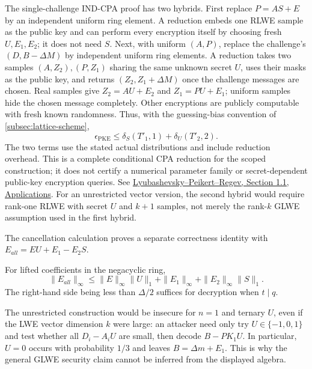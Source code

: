 The single-challenge IND-CPA proof has two hybrids. First replace $P=AS+E$ by an independent uniform ring element. A reduction embeds one RLWE sample as the public key and can perform every encryption itself by choosing fresh $U,E_1,E_2$; it does not need $S$. Next, with uniform $(A,P)$, replace the challenge's $(D,B-\Delta M)$ by independent uniform ring elements. A reduction takes two samples $(A,Z_2),(P,Z_1)$ sharing the same unknown secret $U$, uses their masks as the public key, and returns $(Z_2,Z_1+\Delta M)$ once the challenge messages are chosen. Real samples give $Z_2=AU+E_2$ and $Z_1=PU+E_1$; uniform samples hide the chosen message completely. Other encryptions are publicly computable with fresh known randomness. Thus, with the guessing-bias convention of \autoref{subsec:lattice-scheme},
\[
\epsilon_{\mathrm{PKE}}\le\delta_S(T'_1,1)+\delta_U(T'_2,2).
\]
The two terms use the stated actual distributions and include reduction overhead. This is a complete conditional CPA reduction for the scoped construction; it does not certify a numerical parameter family or secret-dependent public-key encryption queries. See \href{https://web.eecs.umich.edu/~cpeikert/pubs/ideal-lwe.pdf}{Lyubashevsky--Peikert--Regev, Section 1.1, Applications}. For an unrestricted vector version, the second hybrid would require rank-one RLWE with secret $U$ and $k+1$ samples, not merely the rank-$k$ GLWE assumption used in the first hybrid.

The cancellation calculation proves a separate correctness identity with $E_{\mathit{all}}=EU+E_1-E_2S$.

For lifted coefficients in the negacyclic ring,
\[
\|E_{\mathit{all}}\|_\infty\le\|E\|_\infty\|U\|_1+\|E_1\|_\infty+\|E_2\|_\infty\|S\|_1.
\]
The right-hand side being less than $\Delta/2$ suffices for decryption when $t\mid q$.

The unrestricted construction would be insecure for $n=1$ and ternary $U$, even if the LWE vector dimension $k$ were large: an attacker need only try $U\in\{-1,0,1\}$ and test whether all $D_i-A_iU$ are small, then decode $B-\mathit{PK}_1U$. In particular, $U=0$ occurs with probability $1/3$ and leaves $B=\Delta m+E_1$. This is why the general GLWE security claim cannot be inferred from the displayed algebra.
